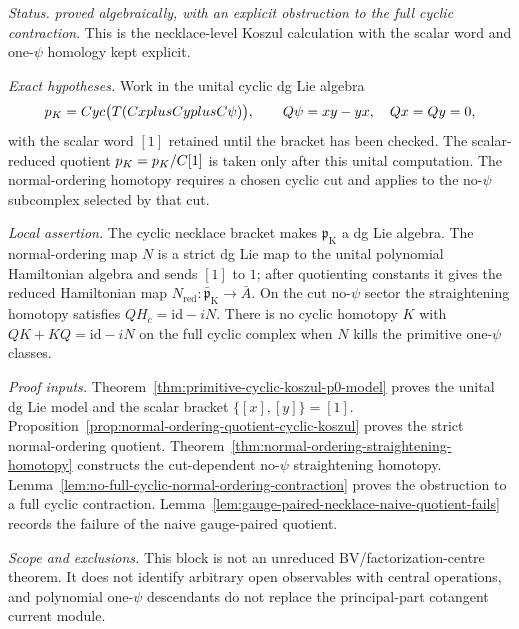 \begin{stmt}\label{thm:lane-cyclic-koszul-normal-ordering}
  \emph{Status.} \emph{proved algebraically, with an explicit
  obstruction to the full cyclic contraction}.  This is the
  necklace-level Koszul calculation with the scalar word and
  one-\(\psi\) homology kept explicit.

  \emph{Exact hypotheses.} Work in the unital cyclic dg Lie algebra
  \[
    p_{K}
    =
    Cyc\bigl(T(C xplusC yplusC\psi)\bigr),
    \qquad
    Q\psi=xy-yx,\quad Qx=Qy=0,
  \]
  with the scalar word \([1]\) retained until the bracket has been
  checked.  The scalar-reduced quotient
  \(p_{K}=p_{K}/C[1]\) is
  taken only after this unital computation.  The normal-ordering
  homotopy requires a chosen cyclic cut and applies to the no-\(\psi\)
  subcomplex selected by that cut.

  \emph{Local assertion.} The cyclic necklace bracket makes
  \(\mathfrak p_{\mathrm K}\) a dg Lie algebra.  The normal-ordering map
  \(N\) is a strict dg Lie map to the unital polynomial Hamiltonian
  algebra and sends \([1]\) to \(1\); after quotienting constants it
  gives the reduced Hamiltonian map
  \(N_{\mathrm{red}}\colon\bar{\mathfrak p}_{\mathrm K}\to\bar A\).
  On the cut no-\(\psi\) sector the straightening homotopy satisfies
  \(QH_c=\mathrm{id}-iN\).  There is no cyclic homotopy
  \(K\) with \(QK+KQ=\mathrm{id}-iN\) on the full cyclic complex when
  \(N\) kills the primitive one-\(\psi\) classes.

  \emph{Proof inputs.}
  Theorem~\ref{thm:primitive-cyclic-koszul-p0-model} proves the unital
  dg Lie model and the scalar bracket \(\{[x],[y]\}=[1]\).
  Proposition~\ref{prop:normal-ordering-quotient-cyclic-koszul}
  proves the strict normal-ordering quotient.
  Theorem~\ref{thm:normal-ordering-straightening-homotopy} constructs
  the cut-dependent no-\(\psi\) straightening homotopy.
  Lemma~\ref{lem:no-full-cyclic-normal-ordering-contraction} proves the
  obstruction to a full cyclic contraction.  Lemma~\ref{lem:gauge-paired-necklace-naive-quotient-fails}
  records the failure of the naive gauge-paired quotient.

  \emph{Scope and exclusions.} This block is not an unreduced
  BV/factorization-centre theorem.  It does not identify arbitrary
  open observables with central operations, and polynomial
  one-\(\psi\) descendants do not replace the principal-part cotangent
  current module.
\end{stmt}

